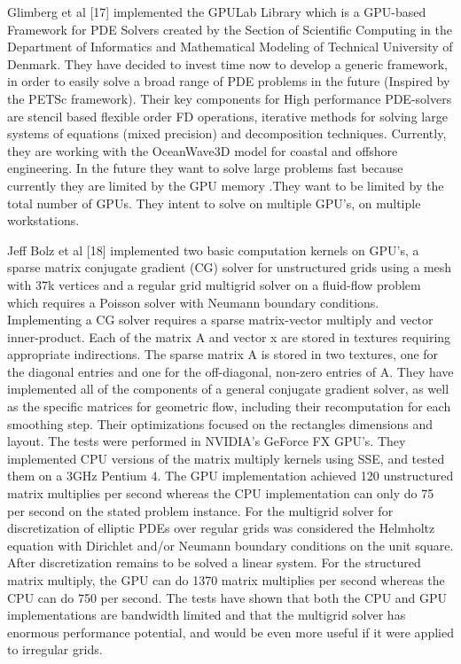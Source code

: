 Glimberg et al [17] implemented the GPULab Library which is a GPU-based Framework for PDE Solvers created by the Section of Scientific Computing in the Department of Informatics and Mathematical Modeling of Technical University of Denmark. They have decided to invest time now to develop a generic framework, in order to easily solve a broad range of PDE problems in the future (Inspired by the PETSc framework). Their key components for High performance PDE-solvers are stencil based flexible order FD operations, iterative methods for solving large systems of equations (mixed precision) and decomposition techniques. Currently, they are working with the OceanWave3D model for coastal and offshore engineering. In the future they want to solve large problems fast because currently they are limited by the GPU memory .They want to be limited by the total number of GPUs. They intent to solve on multiple GPU’s, on multiple workstations. 

Jeff Bolz et al [18] implemented two basic computation kernels on GPU’s, a sparse matrix conjugate gradient (CG) solver for unstructured grids using a mesh with 37k vertices and a regular grid multigrid solver on a fluid-flow problem which requires a Poisson solver with Neumann boundary conditions. Implementing a CG solver requires a sparse matrix-vector multiply and vector inner-product. Each of the matrix A and vector x are stored in textures requiring appropriate indirections. The sparse matrix A is stored in two textures, one for the diagonal entries and one for the off-diagonal, non-zero entries of A. They have implemented all of the components of a general conjugate gradient solver, as well as the specific matrices for geometric flow, including their recomputation for each smoothing step. Their optimizations focused on the rectangles dimensions and layout. The tests were performed in NVIDIA's GeForce FX GPU's. They implemented CPU versions of the matrix multiply kernels using SSE, and tested them on a 3GHz Pentium 4. The GPU implementation achieved 120 unstructured matrix multiplies per second whereas the CPU implementation can only do 75 per second on the stated problem instance. For the multigrid solver for discretization of elliptic PDEs over regular grids was considered the Helmholtz equation with Dirichlet and/or Neumann boundary conditions on the unit square. After discretization remains to be solved a linear system. For the structured matrix multiply, the GPU can do 1370 matrix multiplies per second whereas the CPU can do 750 per second. The tests have shown that both the CPU and GPU implementations are bandwidth limited and that the multigrid solver has enormous performance potential, and would be even more useful if it were applied to irregular grids.

